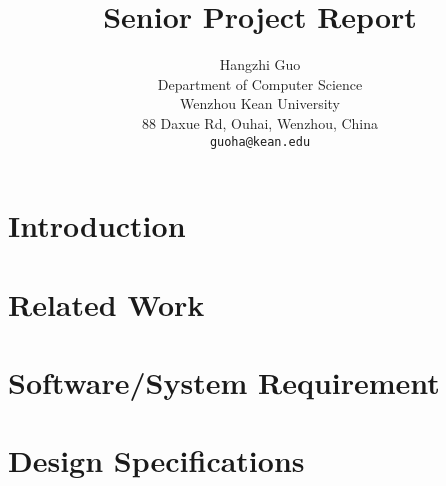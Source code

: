 \documentclass[12pt]{article}
\title{Senior Project Report}
\author{
  Hangzhi Guo \\
  Department of Computer Science\\
  Wenzhou Kean University\\
  88 Daxue Rd, Ouhai, Wenzhou, China \\
  \texttt{guoha@kean.edu} \\
}
\begin{document}
    
    \pagebreak
    

    
    \pagebreak

    
    \pagebreak

    \tableofcontents
    \listoffigures
    \vfill
    \pagebreak



    \section{Introduction}
    

    \section{Related Work}
    

    \section{Software/System Requirement}
    

    \section{Design Specifications}
    
\end{document}
